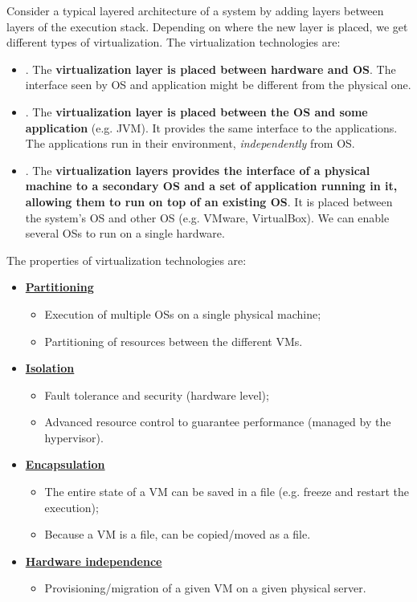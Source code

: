 Consider a typical layered architecture of a system by adding layers between layers of the execution stack. Depending on where the new layer is placed, we get different types of virtualization. The virtualization technologies are:
\begin{itemize}
    \item {}. The \textbf{virtualization layer is placed between hardware and OS}. The interface seen by OS and application might be different from the physical one.
    
    \item {}. The \textbf{virtualization layer is placed between the OS and some application} (e.g. JVM). It provides the same interface to the applications. The applications run in their environment, \emph{independently} from OS.
    
    \item {}. The \textbf{virtualization layers provides the interface of a physical machine to a secondary OS and a set of application running in it, allowing them to run on top of an existing OS}. It is placed between the system's OS and other OS (e.g. VMware, VirtualBox). We can enable several OSs to run on a single hardware.
\end{itemize}
The properties of virtualization technologies are:
\begin{itemize}
    \item \textbf{\underline{Partitioning}}
    \begin{itemize}
        \item Execution of multiple OSs on a single physical machine;
        \item Partitioning of resources between the different VMs.
    \end{itemize}
    
    \item \textbf{\underline{Isolation}}
    \begin{itemize}
        \item Fault tolerance and security (hardware level);
        \item Advanced resource control to guarantee performance (managed by the hypervisor).
    \end{itemize}
    
    \item \textbf{\underline{Encapsulation}}
    \begin{itemize}
        \item The entire state of a VM can be saved in a file (e.g. freeze and restart the execution);
        \item Because a VM is a file, can be copied/moved as a file.
    \end{itemize}
    
    \item \textbf{\underline{Hardware independence}}
    \begin{itemize}
        \item Provisioning/migration of a given VM on a given physical server.
    \end{itemize}
\end{itemize}

